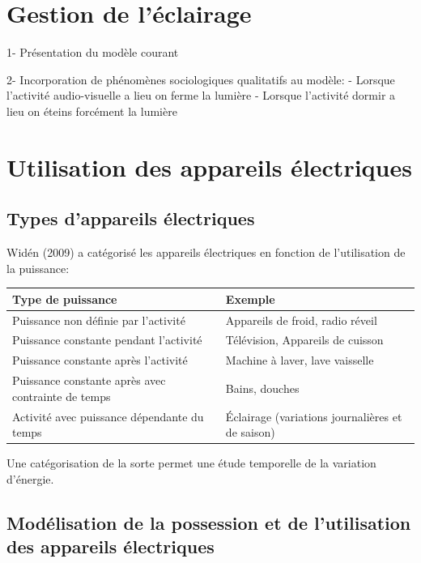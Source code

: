 \section{Gestion de l'éclairage}
\label{Gestion de l'éclairage}

1- Présentation du modèle courant

2- Incorporation de phénomènes sociologiques qualitatifs au modèle:
	- Lorsque l'activité audio-visuelle a lieu on ferme la lumière
	- Lorsque l'activité dormir a lieu on éteins forcément la lumière

\section{Utilisation des appareils électriques}

\subsection{Types d'appareils électriques}

Widén (2009) a catégorisé les appareils électriques en fonction de l'utilisation de la puissance:
\begin{table} [H]
\centering
\begin{tabular}{|l||l|}
Type de puissance & Exemple \\
\hline
\hline Puissance non définie par l'activité & Appareils de froid, radio réveil \\
\hline Puissance constante pendant l'activité & Télévision, Appareils de cuisson \\
\hline Puissance constante après l'activité & Machine à laver, lave vaisselle \\
\hline Puissance constante après avec contrainte de temps & Bains, douches \\
\hline Activité avec puissance dépendante du temps & Éclairage (variations journalières et de saison) \\
\hline 
\end{tabular}
\end{table}
Une catégorisation de la sorte permet une étude temporelle de la variation d'énergie.

\subsection{Modélisation de la possession et de l'utilisation des appareils électriques}

